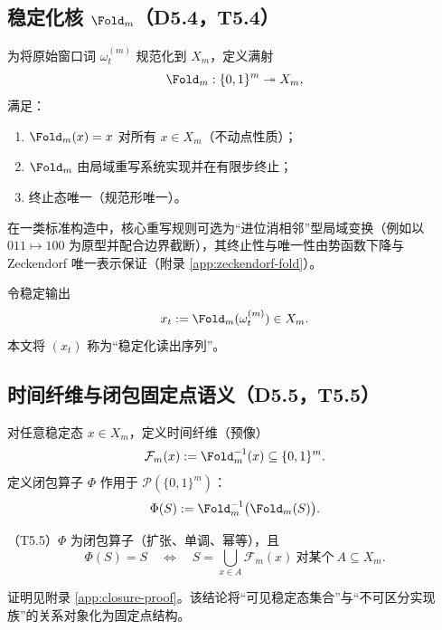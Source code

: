 \subsection{稳定化核 \texorpdfstring{$\Fold_m$}{Fold\_m}（D5.4，T5.4）}

为将原始窗口词 $\omega^{(m)}_t$ 规范化到 $X_m$，定义满射
\[
\Fold_m:\{0,1\}^{m}\twoheadrightarrow X_m,
\]
满足：
\begin{enumerate}
  \item $\Fold_m(x)=x$ 对所有 $x\in X_m$（不动点性质）；
  \item $\Fold_m$ 由局域重写系统实现并在有限步终止；
  \item 终止态唯一（规范形唯一）。
\end{enumerate}
在一类标准构造中，核心重写规则可选为“进位消相邻”型局域变换（例如以 $011\mapsto 100$ 为原型并配合边界截断），其终止性与唯一性由势函数下降与 Zeckendorf 唯一表示保证（附录 \ref{app:zeckendorf-fold}）。

令稳定输出
\[
x_t:=\Fold_m(\omega^{(m)}_t)\in X_m.
\]
本文将 $(x_t)$ 称为“稳定化读出序列”。

\subsection{时间纤维与闭包固定点语义（D5.5，T5.5）}

对任意稳定态 $x\in X_m$，定义时间纤维（预像）
\[
\mathcal{F}_m(x):=\Fold_m^{-1}(x)\subseteq\{0,1\}^{m}.
\]
定义闭包算子 $\Phi$ 作用于 $\mathcal{P}(\{0,1\}^{m})$：
\[
\Phi(S):=\Fold_m^{-1}\big(\Fold_m(S)\big).
\]

\begin{theorem}[闭包与固定点刻画]\label{thm:closure-fixed-points}
（T5.5）$\Phi$ 为闭包算子（扩张、单调、幂等），且
\[
\Phi(S)=S\quad \Longleftrightarrow\quad
S=\bigcup_{x\in A}\mathcal{F}_m(x)\ \text{对某个}\ A\subseteq X_m.
\]
\end{theorem}
证明见附录 \ref{app:closure-proof}。该结论将“可见稳定态集合”与“不可区分实现族”的关系对象化为固定点结构。


